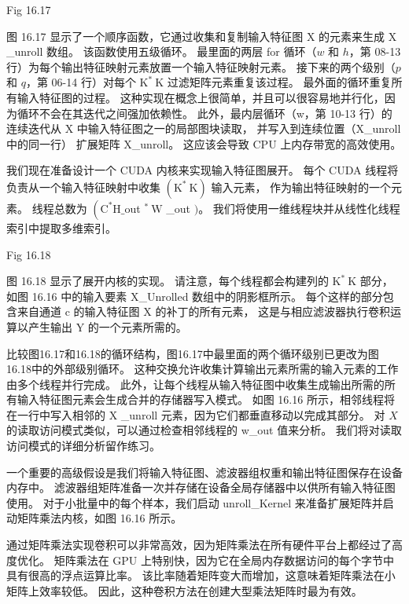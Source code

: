 {\color{red} Fig 16.17}

图 16.17 显示了一个顺序函数，它通过收集和复制输入特征图 $\mathrm{X}$ 的元素来生成 $\mathrm{X}$ \_unroll 数组。 
该函数使用五级循环。 最里面的两层 for 循环（$w$ 和 $h$，第 08-13 行）为每个输出特征映射元素放置一个输入特征映射元素。 
接下来的两个级别（$p$ 和 $q$，第 06-14 行）对每个 $\mathrm{K}^{*} \mathrm{~K}$ 过滤矩阵元素重复该过程。 
最外面的循环重复所有输入特征图的过程。 这种实现在概念上很简单，并且可以很容易地并行化，因为循环不会在其迭代之间强加依赖性。 
此外，最内层循环（w，第 10-13 行）的连续迭代从 $\mathrm{X}$ 中输入特征图之一的局部图块读取，
并写入到连续位置（X\_unroll 中的同一行） 扩展矩阵 X\_unroll。 这应该会导致 CPU 上内存带宽的高效使用。

我们现在准备设计一个 CUDA 内核来实现输入特征图展开。 
每个 CUDA 线程将负责从一个输入特征映射中收集 $\left(\mathrm{K}^{*} \mathrm{~K}\right)$ 输入元素，
作为输出特征映射的一个元素。 
线程总数为 $\left(\mathrm{C}^{*} \mathrm{H} \_\right.$out ${ }^{*} \mathrm{~W}$ \_out $) $。 
我们将使用一维线程块并从线性化线程索引中提取多维索引。

{\color{red} Fig 16.18}

图 16.18 显示了展开内核的实现。 请注意，每个线程都会构建列的 $\mathrm{K}^{*} \mathrm{~K}$ 部分，
如图 16.16 中的输入要素 X\_Unrolled 数组中的阴影框所示。 
每个这样的部分包含来自通道 $\mathrm{c}$ 的输入特征图 $\mathrm{X}$ 的补丁的所有元素，
这是与相应滤波器执行卷积运算以产生输出 Y 的一个元素所需的。

比较图16.17和16.18的循环结构，图16.17中最里面的两个循环级别已更改为图16.18中的外部级别循环。 
这种交换允许收集计算输出元素所需的输入元素的工作由多个线程并行完成。 
此外，让每个线程从输入特征图中收集生成输出所需的所有输入特征图元素会生成合并的存储器写入模式。 
如图 16.16 所示，相邻线程将在一行中写入相邻的 $\mathrm{X}$ \_unroll 元素，因为它们都垂直移动以完成其部分。 
对 $X$ 的读取访问模式类似，可以通过检查相邻线程的 w\_out 值来分析。 我们将对读取访问模式的详细分析留作练习。

一个重要的高级假设是我们将输入特征图、滤波器组权重和输出特征图保存在设备内存中。 
滤波器组矩阵准备一次并存储在设备全局存储器中以供所有输入特征图使用。 
对于小批量中的每个样本，我们启动 unroll\_Kernel 来准备扩展矩阵并启动矩阵乘法内核，如图 16.16 所示。

通过矩阵乘法实现卷积可以非常高效，因为矩阵乘法在所有硬件平台上都经过了高度优化。 
矩阵乘法在 GPU 上特别快，因为它在全局内存数据访问的每个字节中具有很高的浮点运算比率。 
该比率随着矩阵变大而增加，这意味着矩阵乘法在小矩阵上效率较低。 因此，这种卷积方法在创建大型乘法矩阵时最为有效。

